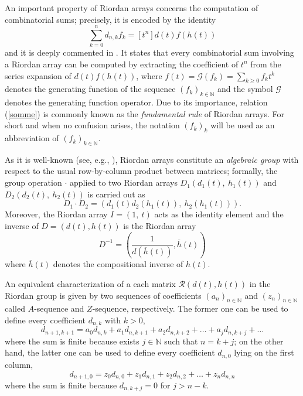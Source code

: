 An important property of Riordan arrays concerns the computation of
combinatorial sums; precisely, it is encoded by the identity
\begin{equation}
    \label{somme}
    \sum_{k=0}^n d_{n,k}f_k=[t^n]d(t)f(h(t))
\end{equation}
and it is deeply commented in
\citep{LUZON2012631,Merlini:2009:CSI:2653507.2654195,SPRUGNOLI1994267}.
It states that every combinatorial sum involving a Riordan array can be computed by
extracting the coefficient of $t^n$ from the series expansion of $d(t)f(h(t))$,
where $f(t)=\mathcal{G}(f_k)=\sum_{k\geq 0}f_kt^k$ denotes the generating function
of the sequence $(f_k)_{k \in\mathbb{N}}$ and the symbol $\mathcal{G}$
denotes the generating function operator. Due to its importance, relation
(\ref{somme}) is commonly known as the \textit{fundamental rule} of Riordan arrays.
For short and when no confusion arises, the notation $(f_k)_{k}$ will be used
as an abbreviation of $(f_k)_{k\in\mathbb{N}}$.

As it is well-known (see, e.g., \citep{LUZON201475,MRSV97,SHAPIRO1991229}),
Riordan arrays constitute an \textit{algebraic group} with respect to the usual
row-by-column product between matrices; formally, the group operation $\cdot$ applied
to two Riordan arrays $D_1(d_1(t),\ h_1(t))$ and $D_2(d_2(t),\ h_2(t))$ is
carried out as
\begin{equation}
  D_1 \cdot D_2 =(d_1(t)d_2(h_1(t)),\ h_2(h_1(t))).
  \label{eq:riordan:group:op}
\end{equation}
Moreover, the Riordan array $I = (1,\ t)$ acts as the identity element and the
inverse of $D =(d(t), h(t))$ is the Riordan array
\begin{equation}
D^{-1} = \left( \frac{1}{d(\overline{h}(t))}, \overline{h}(t) \right)
  \label{eq:riordan:group:inverse}
\end{equation}
where $\overline{h}(t)$ denotes the compositional inverse of $h(t)$.

An equivalent characterization of a each matrix $\mathcal{R}(d(t), h(t))$ in
the Riordan group is given by two sequences of coefficients
$\left(a_{n}\right)_{n\in\mathbb{N}}$  and
$\left(z_{n}\right)_{n\in\mathbb{N}}$ called $A$-sequence and $Z$-sequence,
respectively. The former one can be used to define every
coefficient $d_{n,k}$ with $k>0$,
\begin{displaymath}
    d_{n+1, k+1} = a_{0}d_{n,k} + a_{1}d_{n,k+1} + a_{2}d_{n,k+2} + \ldots + a_{j}d_{n,k+j} + \ldots %
\end{displaymath}
where the sum is finite because exists $j\in\mathbb{N}$ such that $n=k+j$; on
the other hand, the latter one can be used to define every coefficient
$d_{n,0}$ lying on the first column,
\begin{displaymath}
    d_{n+1, 0} = z_{0}d_{n,0} + z_{1}d_{n,1} + z_{2}d_{n,2} + \ldots + z_{n}d_{n,n}
\end{displaymath}
where the sum is finite because $d_{n,k+j}=0$ for $j>n-k$.

